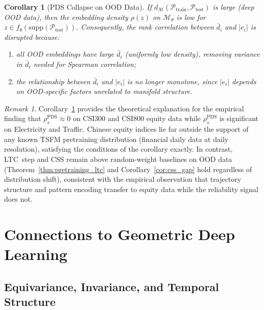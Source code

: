\documentclass[12pt]{article}
\newtheorem{corollary}[theorem]{Corollary}
\theoremstyle{definition}
\theoremstyle{remark}
\newtheorem{remark}[theorem]{Remark}
\newcommand{\Mset}{\mathcal{M}}
\newcommand{\Pset}{\mathcal{P}}
\newcommand{\trm}{\mathcal{M}_\theta}
\newcommand{\rspear}{\rho_s}
\begin{document}
\begin{corollary}[PDS Collapse on OOD Data]
\label{cor:ood_pds}
If $d_\Mset(\Pset_\mathrm{train}, \Pset_\mathrm{test})$ is large (deep OOD
data), then the embedding density $\rho(z)$ on $\trm$ is low for
$z \in f_\theta(\mathrm{supp}(\Pset_\mathrm{test}))$. Consequently, the
rank correlation between $\bar{d}_i$ and $|e_i|$ is disrupted because:
\begin{enumerate}[label=(\roman*)]
  \item all OOD embeddings have large $\bar{d}_i$ (uniformly low density),
        removing variance in $\bar{d}_i$ needed for Spearman correlation;
  \item the relationship between $\bar{d}_i$ and $|e_i|$ is no longer
        monotone, since $|e_i|$ depends on OOD-specific factors unrelated
        to manifold structure.
\end{enumerate}
\end{corollary}

\begin{remark}
Corollary~\ref{cor:ood_pds} provides the theoretical explanation for the
empirical finding that $\rspear^{\mathrm{PDS}} \approx 0$ on CSI300 and
CSI800 equity data while $\rspear^{\mathrm{PDS}}$ is significant on
Electricity and Traffic.
Chinese equity indices lie far outside the support of any known TSFM
pretraining distribution (financial daily data at daily resolution),
satisfying the conditions of the corollary exactly.
In contrast, LTC~step and CSS remain above random-weight baselines on
OOD data (Theorem~\ref{thm:pretraining_ltc} and Corollary~\ref{cor:css_gap}
hold regardless of distribution shift), consistent with the empirical
observation that trajectory structure and pattern encoding transfer to
equity data while the reliability signal does not.
\end{remark}

\section{Connections to Geometric Deep Learning}
\label{sec:gdl_connections}

\subsection{Equivariance, Invariance, and Temporal Structure}
\end{document}
